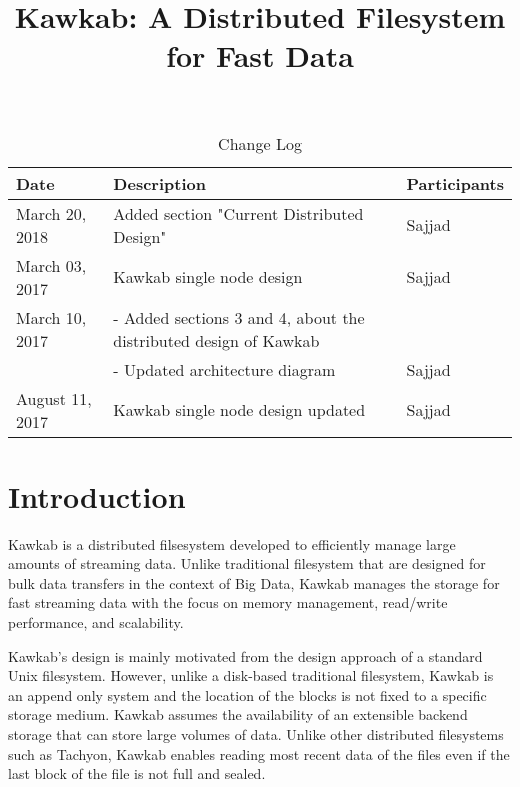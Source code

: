 \documentclass[]{article}
\begin{document}
\title{Kawkab: A Distributed Filesystem for Fast Data}
\date{}
\maketitle

\bgroup
\def\arraystretch{1.5}
\begin{table}[!htb]
\centering
\caption{Change Log}
\label{table:change-log}
\begin{tabular}{|l|l|l|}
\hline
\rowcolor[HTML]{EFEFEF} 
Date             & Description  & Participants  \\ \hline
 March 20, 2018  & Added section "Current Distributed Design" & Sajjad \\ \hline
 March 03, 2017  & Kawkab single node design           & Sajjad  \\ \hline
 March 10, 2017  & - Added sections 3 and 4, about the distributed design of Kawkab& \\ 
                 & - Updated architecture diagram & Sajjad  \\ \hline
 August 11, 2017  & Kawkab single node design updated  & Sajjad  \\ \hline
\end{tabular}
\end{table}
\egroup


\section{Introduction} 

Kawkab is a distributed filsesystem developed to efficiently manage large
amounts of streaming data. Unlike traditional filesystem that are designed for
bulk data transfers in the context of Big Data, Kawkab manages the storage for
fast streaming data with the focus on memory management, read/write
performance, and scalability.


Kawkab's design is mainly motivated from the design approach of a standard Unix filesystem.
However, unlike a disk-based traditional filesystem, Kawkab is an append only
system  and the location of the blocks is not fixed to a specific storage
medium. Kawkab assumes the availability of an extensible backend storage that
can store large volumes of data. Unlike other distributed filesystems such
as Tachyon, Kawkab enables reading most recent data of the files even if the
last block of the file is not full and sealed. 
\end{document}
